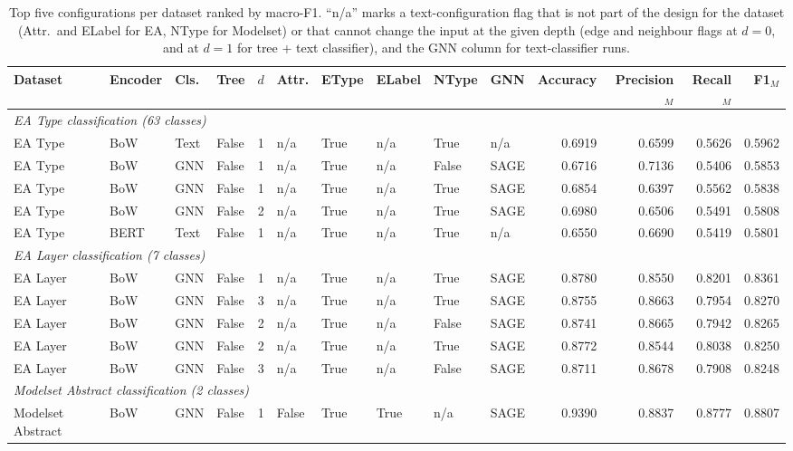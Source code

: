 \begin{table}[t]
\caption{Top five configurations per dataset ranked by macro-F1. ``n/a'' marks a text-configuration flag that is not part of the design for the dataset (Attr.\ and ELabel for EA, NType for Modelset) or that cannot change the input at the given depth (edge and neighbour flags at $d=0$, and at $d=1$ for tree + text classifier), and the GNN column for text-classifier runs.}
\label{tab:top5}
\small
\begin{tabular}{llllrlllllrrrr}
\toprule
Dataset & Encoder & Cls. & Tree & $d$ & Attr. & EType & ELabel & NType & GNN & Accuracy & Precision$_M$ & Recall$_M$ & F1$_M$ \\
\midrule
\multicolumn{14}{l}{\textit{EA Type classification (63 classes)}} \\
EA Type & BoW & Text & False & 1 & n/a & True & n/a & True & n/a & 0.6919 & 0.6599 & 0.5626 & 0.5962 \\
EA Type & BoW & GNN & False & 1 & n/a & True & n/a & False & SAGE & 0.6716 & 0.7136 & 0.5406 & 0.5853 \\
EA Type & BoW & GNN & False & 1 & n/a & True & n/a & True & SAGE & 0.6854 & 0.6397 & 0.5562 & 0.5838 \\
EA Type & BoW & GNN & False & 2 & n/a & True & n/a & True & SAGE & 0.6980 & 0.6506 & 0.5491 & 0.5808 \\
EA Type & BERT & Text & False & 1 & n/a & True & n/a & True & n/a & 0.6550 & 0.6690 & 0.5419 & 0.5801 \\
\midrule
\multicolumn{14}{l}{\textit{EA Layer classification (7 classes)}} \\
EA Layer & BoW & GNN & False & 1 & n/a & True & n/a & True & SAGE & 0.8780 & 0.8550 & 0.8201 & 0.8361 \\
EA Layer & BoW & GNN & False & 3 & n/a & True & n/a & True & SAGE & 0.8755 & 0.8663 & 0.7954 & 0.8270 \\
EA Layer & BoW & GNN & False & 2 & n/a & True & n/a & False & SAGE & 0.8741 & 0.8665 & 0.7942 & 0.8265 \\
EA Layer & BoW & GNN & False & 2 & n/a & True & n/a & True & SAGE & 0.8772 & 0.8544 & 0.8038 & 0.8250 \\
EA Layer & BoW & GNN & False & 3 & n/a & True & n/a & False & SAGE & 0.8711 & 0.8678 & 0.7908 & 0.8248 \\
\midrule
\multicolumn{14}{l}{\textit{Modelset Abstract classification (2 classes)}} \\
Modelset Abstract & BoW & GNN & False & 1 & False & True & True & n/a & SAGE & 0.9390 & 0.8837 & 0.8777 & 0.8807 \\

\end{tabular}
\end{table}

